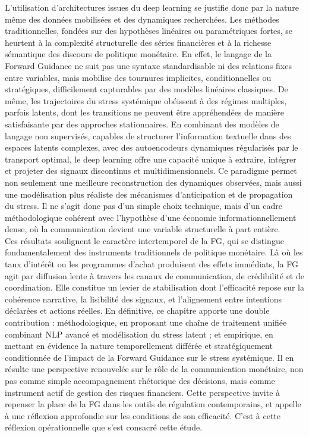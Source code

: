 L’utilisation d’architectures issues du deep learning se justifie donc par la nature même des données mobilisées et des dynamiques recherchées. Les méthodes traditionnelles, fondées sur des hypothèses linéaires ou paramétriques fortes, se heurtent à la complexité structurelle des séries financières et à la richesse sémantique des discours de politique monétaire. En effet, le langage de la Forward Guidance ne suit pas une syntaxe standardisable ni des relations fixes entre variables, mais mobilise des tournures implicites, conditionnelles ou stratégiques, difficilement capturables par des modèles linéaires classiques. De même, les trajectoires du stress systémique obéissent à des régimes multiples, parfois latents, dont les transitions ne peuvent être appréhendées de manière satisfaisante par des approches stationnaires. En combinant des modèles de langage non supervisés, capables de structurer l’information textuelle dans des espaces latents complexes, avec des autoencodeurs dynamiques régularisés par le transport optimal, le deep learning offre une capacité unique à extraire, intégrer et projeter des signaux discontinus et multidimensionnels. Ce paradigme permet non seulement une meilleure reconstruction des dynamiques observées, mais aussi une modélisation plus réaliste des mécanismes d’anticipation et de propagation du stress. Il ne s’agit donc pas d’un simple choix technique, mais d’un cadre méthodologique cohérent avec l’hypothèse d’une économie informationnellement dense, où la communication devient une variable structurelle à part entière.\\

Ces résultats soulignent le caractère intertemporel de la FG, qui se distingue fondamentalement des instruments traditionnels de politique monétaire. Là où les taux d’intérêt ou les programmes d’achat produisent des effets immédiats, la FG agit par diffusion lente à travers les canaux de communication, de crédibilité et de coordination. Elle constitue un levier de stabilisation dont l’efficacité repose sur la cohérence narrative, la lisibilité des signaux, et l’alignement entre intentions déclarées et actions réelles. En définitive, ce chapitre apporte une double contribution : méthodologique, en proposant une chaîne de traitement unifiée combinant NLP avancé et modélisation du stress latent ; et empirique, en mettant en évidence la nature temporellement différée et stratégiquement conditionnée de l’impact de la Forward Guidance sur le stress systémique. Il en résulte une perspective renouvelée sur le rôle de la communication monétaire, non pas comme simple accompagnement rhétorique des décisions, mais comme instrument actif de gestion des risques financiers. Cette perspective invite à repenser la place de la FG dans les outils de régulation contemporains, et appelle à une réflexion approfondie sur les conditions de son efficacité. C’est à cette réflexion opérationnelle que s'est consacré cette étude.